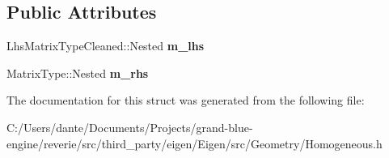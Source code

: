 \subsection*{Public Attributes}
\begin{DoxyCompactItemize}
\item 
\mbox{\label{struct_eigen_1_1internal_1_1homogeneous__left__product__impl_3_01_homogeneous_3_01_matrix_type_042480d8c61b8193bc4c7039abeeef67a_ab544fa7af886024b3f6ae9b21ee4e4b2}} 
Lhs\+Matrix\+Type\+Cleaned\+::\+Nested {\bfseries m\+\_\+lhs}
\item 
\mbox{\label{struct_eigen_1_1internal_1_1homogeneous__left__product__impl_3_01_homogeneous_3_01_matrix_type_042480d8c61b8193bc4c7039abeeef67a_a9d701ea9a8a74e520419ec7071c7028a}} 
Matrix\+Type\+::\+Nested {\bfseries m\+\_\+rhs}
\end{DoxyCompactItemize}


The documentation for this struct was generated from the following file\+:\begin{DoxyCompactItemize}
\item 
C\+:/\+Users/dante/\+Documents/\+Projects/grand-\/blue-\/engine/reverie/src/third\+\_\+party/eigen/\+Eigen/src/\+Geometry/Homogeneous.\+h\end{DoxyCompactItemize}
